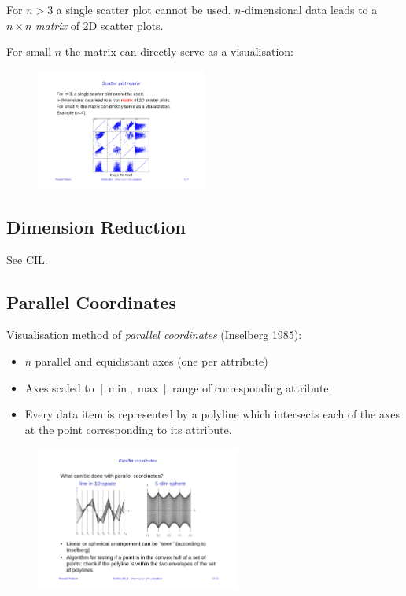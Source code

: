 For $n>3$ a single scatter plot cannot be used. $n$-dimensional data leads to a $n\times n$ \emph{matrix} of 2D scatter plots.

For small $n$ the matrix can directly serve as a visualisation:
\begin{figure}[H]
\centering
\includegraphics[width=0.5\textwidth]{img/12_scatter_plot_matrix}
\end{figure}

\subsection{Dimension Reduction}
See CIL.

\subsection{Parallel Coordinates}
Visualisation method of \emph{parallel coordinates} (Inselberg 1985):
\begin{itemize}
\item $n$ parallel and equidistant axes (one per attribute)
\item Axes scaled to $[\min,\max]$ range of corresponding attribute. 
\item Every data item is represented by a polyline which intersects each of the axes at the point corresponding to its attribute.
\end{itemize}
\begin{figure}[H]
\centering
\includegraphics[width=0.6\textwidth]{img/12_parallel_coordinates}
\end{figure}

